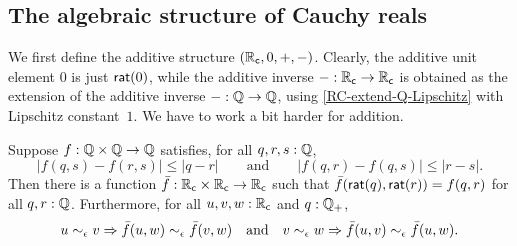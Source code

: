 \subsection{The algebraic structure of Cauchy reals}
\label{sec:algebr-struct-cauchy}

We first define the additive structure $(\mathbb{R}_\mathsf{c}, 0, {+}, {-})$. Clearly, the additive unit element
$0$ is just $\mathsf{rat}(0)$, while the additive inverse ${-} : \mathbb{R}_\mathsf{c} \to \mathbb{R}_\mathsf{c}$ is obtained as the
extension of the additive inverse ${-} : \mathbb{Q} \to \mathbb{Q}$, using \autoref{RC-extend-Q-Lipschitz}
with Lipschitz constant~$1$. We have to work a bit harder for addition.

\begin{lem} \label{RC-binary-nonexpanding-extension}
  Suppose $f : \mathbb{Q} \times \mathbb{Q} \to \mathbb{Q}$ satisfies, for all $q, r, s : \mathbb{Q}$,
  \begin{equation*}
    |f(q, s) - f(r, s)| \leq |q - r|
    \qquad\text{and}\qquad
    |f(q, r) - f(q, s)| \leq |r - s|.
  \end{equation*}
  Then there is a function $\bar{f} : \mathbb{R}_\mathsf{c} \times \mathbb{R}_\mathsf{c} \to \mathbb{R}_\mathsf{c}$ such that
  $\bar{f}(\mathsf{rat}(q), \mathsf{rat}(r)) = f(q,r)$ for all $q, r : \mathbb{Q}$. Furthermore,
  for all $u, v, w : \mathbb{R}_\mathsf{c}$ and $q : \mathbb{Q}_{+}$,
  \begin{equation*}
    u \sim_{\epsilon} v \Rightarrow \bar{f}(u,w) \sim_{\epsilon} \bar{f}(v,w)
    \quad\text{and}\quad
    v \sim_{\epsilon} w \Rightarrow \bar{f}(u,v) \sim_{\epsilon} \bar{f}(u,w).
  \end{equation*}
\end{lem}

